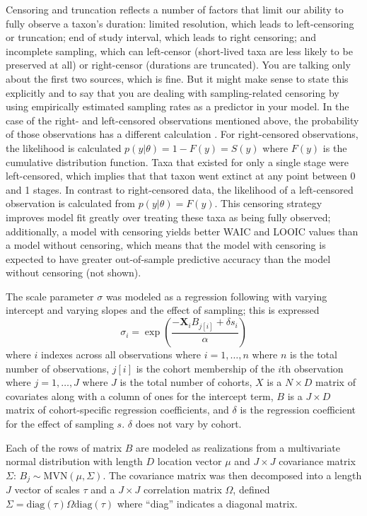 \documentclass[11pt]{article}
\begin{document}
Censoring and truncation reflects a number of factors that limit our ability to fully observe a taxon's duration: limited resolution, which leads to left-censoring or truncation; end of study interval, which leads to right censoring; and incomplete sampling, which can left-censor (short-lived taxa are less likely to be preserved at all) or right-censor (durations are truncated). You are talking only about the first two sources, which is fine. But it might make sense to state this explicitly and to say that you are dealing with sampling-related censoring by using empirically estimated sampling rates as a predictor in your model.
In the case of the right- and left-censored observations mentioned above, the probability of those observations has a different calculation \citep{Klein2003}. For right-censored observations, the likelihood is calculated \(p(y | \theta) = 1 - F(y) = S(y)\) where \(F(y)\) is the cumulative distribution function. Taxa that existed for only a single stage were left-censored, which implies that that taxon went extinct at any point between 0 and 1 stages. In contrast to right-censored data, the likelihood of a left-censored observation is calculated from \(p(y | \theta) = F(y)\). This censoring strategy improves model fit greatly over treating these taxa as being fully observed; additionally, a model with censoring yields better WAIC and LOOIC values than a model without censoring, which means that the model with censoring is expected to have greater out-of-sample predictive accuracy than the model without censoring (not shown).

The scale parameter \(\sigma\) was modeled as a regression following \citet{Kleinbaum2005} with varying intercept and varying slopes and the effect of sampling; this is expressed
\begin{equation}
  \sigma_{i} = \exp\left(\frac{-\mathbf{X}_{i} B_{j[i]} + \delta s_{i}}{\alpha}\right)
  \label{eq:sigma}
\end{equation}
where \(i\) indexes across all observations where \(i = 1, \dots, n\) where \(n\) is the total number of observations, \(j[i]\) is the cohort membership of the \(i\)th observation where \(j = 1, \dots, J\) where \(J\) is the total number of cohorts, \(X\) is a \(N \times D\) matrix of covariates along with a column of ones for the intercept term, \(B\) is a \(J \times D\) matrix of cohort-specific regression coefficients, and \(\delta\) is the regression coefficient for the effect of sampling \(s\). \(\delta\) does not vary by cohort.

Each of the rows of matrix \(B\) are modeled as realizations from a multivariate normal distribution with length \(D\) location vector \(\mu\) and \(J \times J\) covariance matrix \(\Sigma\): \(B_{j} \sim \mathrm{MVN}(\mu, \Sigma)\). The covariance matrix was then decomposed into a length \(J\) vector of scales \(\tau\) and a \(J \times J\) correlation matrix \(\Omega\), defined \(\Sigma = \mathrm{diag}(\tau) \Omega \mathrm{diag}(\tau)\) where ``diag'' indicates a diagonal matrix.
\end{document}
